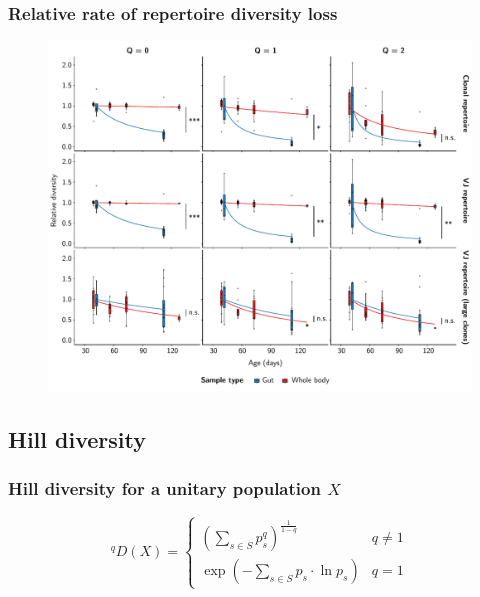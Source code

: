 \documentclass[presentation]{beamer}
\newlength{\slideheight}
\begin{document}
\begin{frame}
\frametitle{Relative rate of repertoire diversity loss}
\begin{figure}
\includegraphics[height=\slideheight]{figs/pdf/extra/comparative-diversity}
\end{figure}
\end{frame}



 

\subsection{Hill diversity}

\begin{frame}
\frametitle{Hill diversity for a unitary population $X$}
\begin{equation*}
^qD(X) = \begin{cases} \left(\displaystyle\sum_{s \in S} p_s^q \right)^{\frac{1}{1-q}} & q \neq 1\\
\exp\left(-\displaystyle\sum_{s \in S}p_s \cdot \ln p_s\right) & q = 1 \end{cases}
\end{equation*}
\end{frame}
\end{document}
